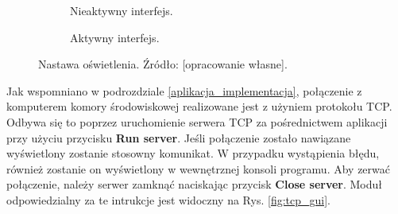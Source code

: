 \begin{figure}[h]
	\centering
	
	\begin{subfigure}[h]{.49\textwidth}
		\centering
		\setlength{\fboxsep}{0pt}
		\setlength{\fboxrule}{1pt}
		\caption{Nieaktywny interfejs.}
		\label{fig:oswietlacz_gui_nieaktywne}
	\end{subfigure}
	\hfill%
	\begin{subfigure}[h]{.49\textwidth}
		\centering
		\setlength{\fboxsep}{0pt}
		\setlength{\fboxrule}{1pt}
		\caption{Aktywny interfejs.} 
		\label{fig:oswietlacz_gui_aktywne}
	\end{subfigure}
	
	\caption{Nastawa oświetlenia. Źródło: [opracowanie własne].}
	\label{fig:oswietlacz_gui}
		
\end{figure}
Jak wspomniano w podrozdziale \ref{aplikacja_implementacja}, połączenie z komputerem komory środowiskowej realizowane jest z użyniem protokołu TCP. Odbywa się to poprzez uruchomienie serwera TCP za pośrednictwem aplikacji przy użyciu przycisku \textbf{Run server}. Jeśli połączenie zostało nawiązane wyświetlony zostanie stosowny komunikat. W przypadku wystąpienia błędu, również zostanie on wyświetlony w wewnętrznej konsoli programu. Aby zerwać połączenie, należy serwer zamknąć naciskając przycisk \textbf{Close server}. Moduł odpowiedzialny za te intrukcje jest widoczny na Rys. \ref{fig:tcp_gui}.\\

